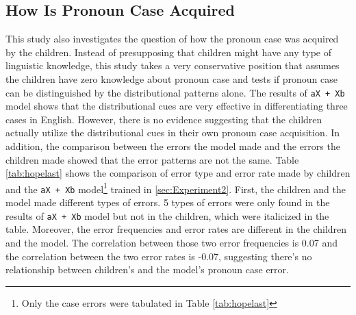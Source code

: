 \subsection{How Is Pronoun Case Acquired}
This study also investigates the question of how the pronoun case was acquired by the children. Instead of presupposing that children might have any type of linguistic knowledge, this study takes a very conservative position that assumes the children have zero knowledge about pronoun case and tests if pronoun case can be distinguished by the distributional patterns alone. The results of \texttt{aX + Xb} model shows that the distributional cues are very effective in differentiating three cases in English. However, there is no evidence suggesting that the children actually utilize the distributional cues in their own pronoun case acquisition. In addition, the comparison between the errors the model made and the errors the children made showed that the error patterns are not the same. Table \ref{tab:hopelast} shows the comparison of error type and error rate made by children and the \texttt{aX + Xb} model\footnote{Only the case errors were tabulated in Table \ref{tab:hopelast}} trained in \ref{sec:Experiment2}. First, the children and the model made different types of errors. 5 types of errors were only found in the results of \texttt{aX + Xb} model but not in the children, which were italicized in the table. Moreover, the error frequencies and error rates are different in the children and the model. The correlation between those two error frequencies is 0.07 and the correlation between the two error rates is -0.07, suggesting there's no relationship between children's and the model's pronoun case error.


